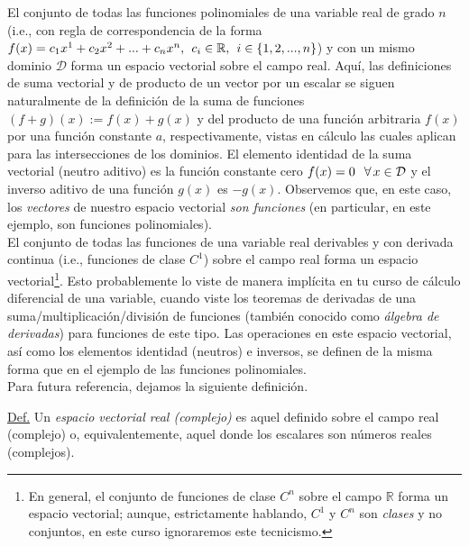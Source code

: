 \documentclass[apuntes]{subfiles}
\begin{document}
El conjunto de todas las funciones polinomiales de una variable real de grado $n$ (i.e., con regla de correspondencia de la forma $f(x) = c_1 x^1 + c_2 x^2 + ... + c_n x^n, \hspace{1.5mm} c_i \in \mathbb{R}, \hspace{1.5mm} i \in \{1,2,...,n\}$) y con un mismo dominio $\mathcal{D}$ forma un espacio vectorial sobre el campo real. Aquí, las definiciones de suma vectorial y de producto de un vector por un escalar se siguen naturalmente de la definición de la suma de funciones $(f+g)(x):= f(x)+g(x)$ y del producto de una función arbitraria $f(x)$ por una función constante $a$, respectivamente, vistas en cálculo \textemdash las cuales aplican para las intersecciones de los dominios. El elemento identidad de la suma vectorial (neutro aditivo) es la función constante cero $f(x)=0\hspace{2.5mm} \forall\hspace{0.5mm}x\in\mathcal{D}$ y el inverso aditivo de una función $g(x)$ es $-g(x)$. Observemos que, en este caso, los \emph{vectores} de nuestro espacio vectorial \emph{son funciones} (en particular, en este ejemplo, son funciones polinomiales). \\

El conjunto de todas las funciones de una variable real derivables y con derivada continua (i.e., funciones de clase $C^1$) sobre el campo real forma un espacio vectorial\footnote{En general, el conjunto de funciones de clase $C^n$ sobre el campo $\mathbb{R}$ forma un espacio vectorial; aunque, estrictamente hablando, $C^1$ y $C^n$ son \emph{clases} y no conjuntos, en este curso ignoraremos este tecnicismo.}. Esto probablemente lo viste de manera implícita en tu curso de cálculo diferencial de una variable, cuando viste los teoremas de derivadas de una suma/multiplicación/división de funciones (también conocido como \emph{álgebra de derivadas}) para funciones de este tipo. Las operaciones en este espacio vectorial, así como los elementos identidad (neutros) e inversos, se definen de la misma forma que en el ejemplo de las funciones polinomiales. \\

Para futura referencia, dejamos la siguiente definición.

\begin{tcolorbox}
    \underline{Def.} Un \emph{espacio vectorial real (complejo)} es aquel definido sobre el campo real (complejo) o, equivalentemente, aquel donde los escalares son números reales (complejos).
\end{tcolorbox}{}
\end{document}
